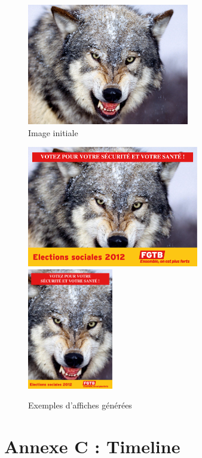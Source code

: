\documentclass{article}
\begin{document}
\begin{sffamily}
\begin{figure}[h!]
\begin{center} \includegraphics[height=200px]{before.jpg} \end{center}
\caption{Image initiale}
\end{figure}

\begin{figure}[h!]
\begin{center} \includegraphics[height=200px]{after_land.pdf} $\qquad$ \includegraphics[height=200px]{after_port.pdf} \end{center}
\caption{Exemples d'affiches générées}
\end{figure}

\newpage

\section{Annexe C : Timeline}\label{timeline}


\end{sffamily}
\end{document}
